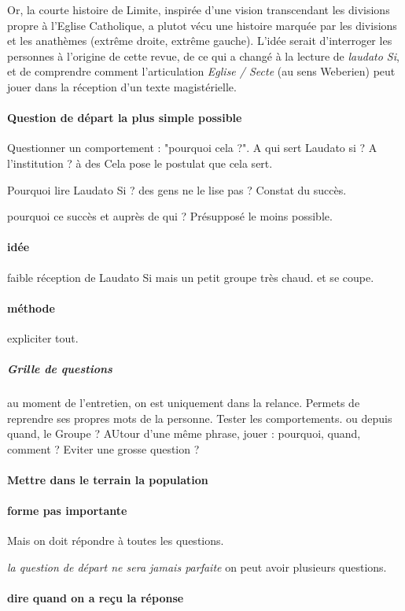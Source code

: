 Or, la courte histoire de Limite, inspirée d'une vision transcendant les divisions propre à l'Eglise Catholique, a plutot vécu une histoire marquée par les divisions et les anathèmes (extrême droite, extrême gauche). 
L'idée serait d'interroger les personnes à l'origine de cette revue, de ce qui a changé à la lecture de \textit{laudato Si},  et de comprendre comment l'articulation \textit{Eglise / Secte} (au sens Weberien) peut jouer dans la réception d'un texte magistérielle.




\paragraph{Question de départ la plus simple possible}
Questionner un comportement : "pourquoi cela ?". 
A qui sert Laudato si ? A l'institution ?  à des 
Cela pose le postulat que cela sert.

Pourquoi lire Laudato Si ? des gens ne le lise pas ?  Constat du succès. 

pourquoi ce succès et auprès de qui ? 
Présupposé le moins possible. 


\paragraph{idée } faible réception de Laudato Si mais un petit groupe très chaud. et se coupe.

\paragraph{méthode} expliciter tout.
\subparagraph{Grille de questions} au moment de l'entretien, on est uniquement dans la relance. Permets de reprendre ses propres mots de la personne. 
Tester les comportements. ou depuis quand, le Groupe ? AUtour d'une même phrase, jouer : pourquoi, quand, comment ? Eviter une grosse question ? 
\paragraph{Mettre dans le terrain la population}
\paragraph{forme pas importante} Mais on doit répondre à toutes les questions.


\textit{la question de départ ne sera jamais parfaite} on peut avoir plusieurs questions. 

\paragraph{dire quand on a reçu la réponse}


